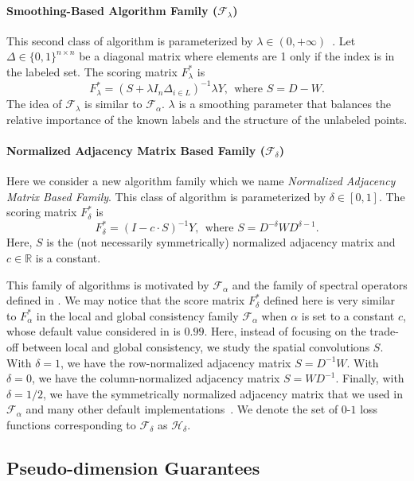 \paragraph{Smoothing-Based Algorithm Family ($\mathcal{F}_\lambda$)}
This second class of algorithm is parameterized by $\lambda \in (0,+\infty)$~\citep{delalleau2005efficient}. Let $\Delta \in \{0,1\}^{n \times n}$ be a diagonal matrix where elements are 1 only if the index is in the labeled set. The scoring matrix $F^*_\lambda$ is
\[ F^*_\lambda = (S + \lambda I_n \Delta_{i \in L})^{-1} \lambda Y, ~~\text{where } S = D-W. \]
The idea of $\mathcal{F}_\lambda$ is similar to $\mathcal{F}_\alpha$. $\lambda$ is a smoothing parameter that balances the relative importance of the known labels and the structure of the unlabeled points.

\paragraph{Normalized Adjacency Matrix Based Family ($\mathcal{F}_\delta$)}
Here we consider a new algorithm family which we name \emph{Normalized Adjacency Matrix Based Family}.
This class of algorithm is parameterized by $\delta \in [0,1]$. The scoring matrix $F^*_\delta$ is 
\[F^*_\delta = (I-c\cdot S)^{-1} Y,
~~\text{where } S = D^{-\delta}WD^{\delta - 1}. \] 
Here, $S$ is the (not necessarily symmetrically) normalized adjacency matrix and $c \in \mathbb{R}$ is a constant.

This family of algorithms is motivated by $\mathcal{F}_\alpha$ and the family of spectral operators defined in \cite{donnat2023studying}. We may notice that the score matrix $F^*_\delta$ defined here is very similar to $F^*_\alpha$ in the local and global consistency family $\mathcal{F}_\alpha$ when $\alpha$ is set to a constant $c$, whose default value considered in \cite{zhou2003learning} is $0.99$. Here, instead of focusing on the trade-off between local and global consistency, we study the spatial convolutions $S$. With $\delta = 1$, we have the row-normalized adjacency matrix $S = D^{-1}W$. With $\delta = 0$, we have the column-normalized adjacency matrix $S = WD^{-1}$. Finally, with $\delta = 1/2$, we have the symmetrically normalized adjacency matrix that we used in $\mathcal{F}_\alpha$ and many other default implementations~\citep{donnat2023studying, wu19simplifying}.
We denote the set of $0$-$1$ loss functions corresponding to $\mathcal{F}_\delta$ as $\mathcal{H}_\delta$. 

\subsection{Pseudo-dimension Guarantees}

